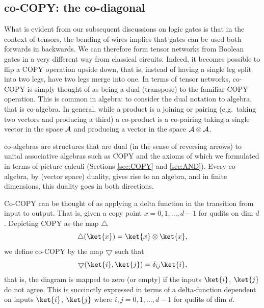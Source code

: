 \subsection*{co-{\sf COPY}: the co-diagonal}\label{sec:co-diagonal}
What is evident from our subsequent discussions on logic gates is that in the context
of tensors, the bending of wires implies that gates can be used both forwards in backwards. We can therefore form tensor networks from Boolean gates
in a very
different way from classical circuits. Indeed, it becomes possible to flip a {\sf
COPY} operation upside down,
that is, instead of having a single leg split into two legs, have two legs merge into
one.  In
terms of tensor networks, co-{\sf COPY} is simply
thought of as being a dual (transpose) to the familiar {\sf COPY} operation. This is
common in
algebra: to consider the dual
notation to algebra, that is co-algebra.  In general, while a product is a joining or pairing (e.g.\ taking two
vectors and producing a third) a co-product is a co-pairing taking a single vector
in the space ${\cal A}$ and producing a vector in the space ${\cal A}\otimes {\cal A}$.

\begin{remark} 
co-algebras are structures that are dual (in the sense of
reversing arrows) to unital associative algebras such as {\sf COPY} and
\AND{} the axioms of which we formulated in terms of picture calculi
(Sections \ref{sec:COPY} and \ref{sec:AND}).  Every co-algebra, by
(vector space) duality, gives rise to an algebra, and in finite dimensions, this duality goes in both directions.  
\end{remark}

Co-{\sf COPY} can be thought of as applying a delta function in the transition from
input to output.  That is, given a copy point $x=0,1,...,d-1$ for qudits on dim $d$.
 Depicting {\sf COPY} as the map
$\bigtriangleup$
\begin{equation}
\bigtriangleup(\ket{x})=\ket{x}\otimes\ket{x},
\end{equation}
we define co-{\sf COPY} by the map $\bigtriangledown$ such that 
\begin{equation}
\bigtriangledown(\ket{i},\ket{j})=\delta_{ij} \ket{i},
\end{equation}
that is, the diagram is mapped to zero (or empty) if the inputs $\ket{i}$, $\ket{j}$
do not agree.  This is succinctly expressed in terms of a delta-function dependent on
inputs $\ket{i}$, $\ket{j}$ where $i,j=0,1,...,d-1$ for qudits of dim $d$.

